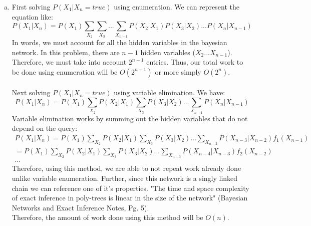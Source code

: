 \documentclass{article}
\begin{document}
\begin{enumerate}[a)]
\newpage
    \item First solving $P(X_1|X_n = true)$ using enumeration. We can represent the equation like:
    \[ 
    P(X_1 | X_n) = P(X_1)\sum_{X_2}\sum_{X_3} ... \sum_{X_{n-1}} P(X_2 | X_1) P(X_3|X_2) ... P(X_n|X_{n-1}) 
    \]
    In words, we must account for all the hidden variables in the bayesian network. In this problem, there are
    $n - 1$ hidden variables ($X_2 ... X_{n-1}$). Therefore, we must take into account $2^{n-1}$ entries. 
    Thus, our total work to be done using enumeration will be $O(2^{n-1})$ or more simply $O(2^{n})$.\\
    \\
    Next solving $P(X_1|X_n = true)$ using variable elimination. We have:
    \[
    P(X_1 | X_n) = P(X_1)\sum_{X_2}P(X_2 | X_1)\sum_{X_3}P(X_3|X_2) ... \sum_{X_{n-1}} P(X_n|X_{n-1})
    \]
    Variable elimination works by summing out the hidden variables that do not depend on the query:
    \begin{gather*}
    P(X_1 | X_n) = P(X_1)\sum_{X_2}P(X_2 | X_1)\sum_{X_3}P(X_3|X_2) ... \sum_{X_{n-2}} P(X_{n-3}|X_{n-2})f_1(X_{n-1})\\
    = P(X_1)\sum_{X_2}P(X_2 | X_1)\sum_{X_3}P(X_3|X_2) ... \sum_{X_{n-3}} P(X_{n-4}|X_{n-3})f_2(X_{n-2})\\
    ...
    \end{gather*}
    Therefore, using this method, we are able to not repeat work already done unlike variable enumeration.
    Further, since this network is a singly linked chain we can reference one of it's properties. 
    "The time and space complexity of exact inference in poly-trees is linear in the size of the network" 
    (Bayesian Networks and Exact Inference Notes, Pg. 5).\\
    Therefore, the amount of work done using this method will be $O(n)$.
\newpage
\end{enumerate}
\end{document}
